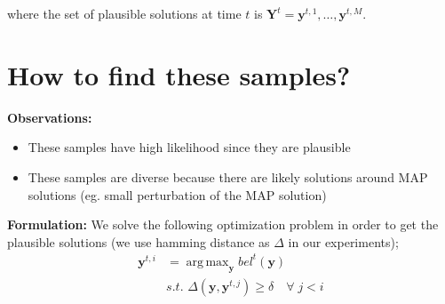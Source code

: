 \documentclass[conference]{IEEEtran}
\newcommand{\argmax}{\operatorname{arg\,max}}
\begin{document}
where the set of plausible solutions at time $t$ is \mbox{$\mathbf{Y}^t={\mathbf{y}^{t,1},\ldots,\mathbf{y}^{t,M}}$}.

\section{How to find these samples?}
\textbf{Observations:}
\begin{itemize}
\item These samples have high likelihood since they are plausible
\item These samples are diverse because there are likely solutions around MAP solutions (eg. small perturbation of the MAP solution)
\end{itemize}

\textbf{Formulation:} We solve the following optimization problem in order to get the plausible solutions (we use hamming distance as $\Delta$ in our experiments);
\begin{equation}
\begin{aligned}
\mathbf{y}^{t,i} &= \argmax_{\mathbf{y}}  bel^t(\mathbf{y}) \\
&s.t.\,\, \Delta(\mathbf{y},\mathbf{y}^{t,j}) \geq \delta \quad \forall \; {j < i}
\end{aligned}
\label{divopt}
\end{equation}
\end{document}

